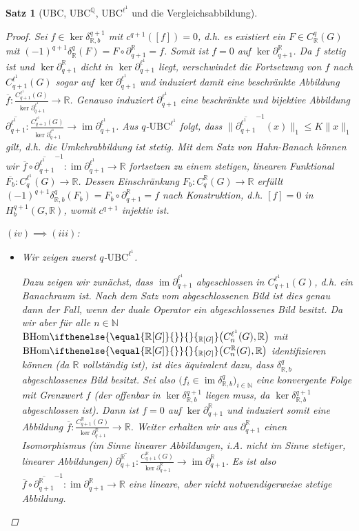 \documentclass[a4paper,twoside,10pt]{scrreprt}
\DeclareMathOperator{\img}{im}
\newcommand{\UBC}{\text{UBC}}
\newcommand{\N}{\mathbb{N}}
\newcommand{\Q}{\mathbb{Q}}
\newcommand{\R}{\mathbb{R}}
\newcommand{\BHom}[2][]{\text{BHom}%
\ifthenelse{\equal{#1}{}}{}{_{#1}}%
\bigl(#2\bigr)}%
\newtheorem{satz}{Satz}[section]
\theoremstyle{definition}
\begin{document}
\begin{satz}[UBC, $\UBC^{\Q}$, $\UBC^{\ell^1}$ und die Vergleichsabbildung]
\begin{proof}
Sei $f\in \ker \delta_{\R,b}^{q+1}$ mit $c^{q+1}([f])=0$, d.h. es existiert ein $F\in C_{\R}^q(G)$ mit $(-1)^{q+1}\delta_{\R}^q(F)=F\circ \partial_{q+1}^{\R}=f$. Somit ist $f=0$ auf $\ker \partial_{q+1}^{\R}$. Da $f$ stetig ist und $\ker \partial_{q+1}^{\R}$ dicht in $\ker \partial_{q+1}^{\ell^1}$ liegt, verschwindet die Fortsetzung von $f$ nach $C^{\ell^1}_{q+1}(G)$ sogar auf $\ker \partial_{q+1}^{\ell^1}$ und induziert damit eine beschränkte Abbildung $\overline{f}:\frac{C_{q+1}^{\ell^1}(G)}{\ker \partial_{q+1}^{\ell^1}}\to \R$. Genauso induziert $\partial_{q+1}^{\ell^1}$ eine beschränkte und bijektive Abbildung $\overline{\partial_{q+1}^{\ell^1}}:\frac{C_{q+1}^{\ell^1}(G)}{\ker \partial_{q+1}^{\ell^1}}\to \img \partial_{q+1}^{\ell^1}$. Aus $q$-$\text{UBC}^{\ell^1}$ folgt, dass $\|\overline{\partial_{q+1}^{\ell^1}}^{-1}(x)\|_1\leq K\|x\|_1$ gilt, d.h. die Umkehrabbildung ist stetig. Mit dem Satz von Hahn-Banach können wir $\overline{f}\circ \overline{\partial_{q+1}^{\ell^1}}^{-1}:\img \partial_{q+1}^{\ell^1}\to \R$ fortsetzen zu einem stetigen, linearen Funktional $\overline{F_b}:C_q^{\ell^1}(G)\to \R$. Dessen Einschränkung $F_b:C^{\R}_q(G)\to \R$ erfüllt $(-1)^{q+1}\delta_{\R,b}^q(F_b)=F_b\circ \partial_{q+1}^{\R}=f$ nach Konstruktion, d.h. $[f]=0$ in $H_b^{q+1}(G,\R)$, womit $c^{q+1}$ injektiv ist.\par\noindent
$(iv)\implies (iii)$:
\begin{itemize}
\item Wir zeigen zuerst $q$-$\text{UBC}^{\ell^1}$.\par
Dazu zeigen wir zunächst, dass $\img \partial_{q+1}^{\ell^1}$ abgeschlossen in $C_{q+1}^{\ell^1}(G)$, d.h. ein Banachraum ist. Nach dem Satz vom abgeschlossenen Bild ist dies genau dann der Fall, wenn der duale Operator ein abgeschlossenes Bild besitzt. Da wir aber für alle $n\in \N$ $\BHom[\R{[}G{]}]{C_n^{\ell^1}(G),\R}$ mit $\BHom[\R{[}G{]}]{C_n^{\R}(G),\R}$ identifizieren können (da $\R$ vollständig ist), ist dies äquivalent dazu, dass $\delta_{\R,b}^q$ abgeschlossenes Bild besitzt. Sei also $\bigl(f_i\in \img \delta_{\R,b}^q\bigr)_{i\in \N}$ eine konvergente Folge mit Grenzwert $f$ (der offenbar in $\ker \delta_{\R,b}^{q+1}$ liegen muss, da $\ker \delta_{\R,b}^{q+1}$ abgeschlossen ist). Dann ist $f=0$ auf $\ker \partial_{q+1}^{\R}$ und induziert somit eine Abbildung $\overline{f}:\frac{C_{q+1}^{\R}(G)}{\ker \partial_{q+1}^{\R}}\to \R$. Weiter erhalten wir aus $\partial_{q+1}^{\R}$ einen Isomorphismus (im Sinne linearer Abbildungen, i.A. nicht im Sinne stetiger, linearer Abbildungen) $\overline{\partial_{q+1}^{\R}}:\frac{C_{q+1}^{\R}(G)}{\ker \partial_{q+1}^{\R}}\to \img \partial_{q+1}^{\R}$. Es ist also $\overline{f}\circ\overline{\partial_{q+1}^{\R}}^{-1}:\img \partial_{q+1}^{\R}\to \R$ eine lineare, aber nicht notwendigerweise stetige Abbildung.

\end{itemize}
\end{proof}
\end{satz}
\end{document}

